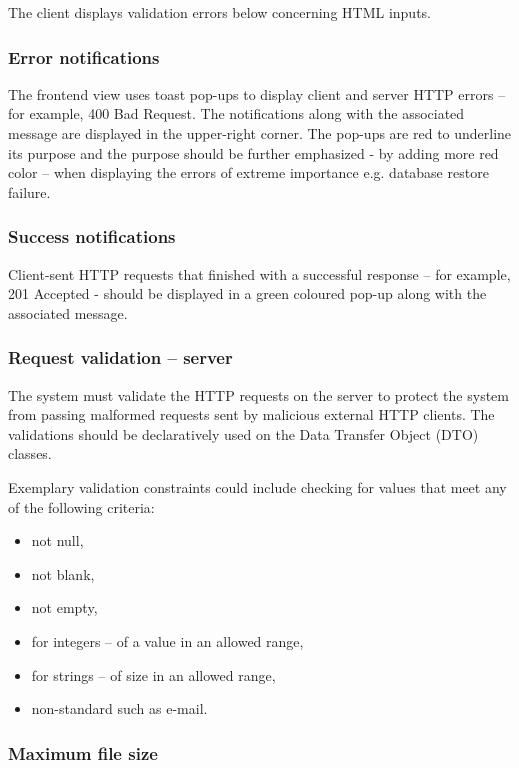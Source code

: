\documentclass[a4paper,twoside,12pt]{book}
\begin{document}
The client displays validation errors below concerning HTML inputs.

\subsubsection{Error notifications}

The frontend view uses toast pop-ups to display client and server HTTP errors \cite{bib:rfc7231} – for example, 400 Bad Request. The notifications along with the associated message are displayed in the upper-right corner. The pop-ups are red to underline its purpose and the purpose should be further emphasized - by adding more red color – when displaying the errors of extreme importance e.g. database restore failure.

\subsubsection{Success notifications}

Client-sent HTTP requests that finished with a successful response \cite{bib:rfc7231} – for example, 201 Accepted - should be displayed in a green coloured pop-up along with the associated message.

\subsubsection{Request validation – server}

The system must validate the HTTP requests on the server to protect the system from passing malformed requests sent by malicious external HTTP clients. The validations should be declaratively used on the Data Transfer Object (DTO) classes. 

Exemplary validation constraints could include checking for values that meet any of the following criteria:
\begin{itemize}
\item not null,
\item not blank,
\item not empty,
\item for integers – of a value in an allowed range,
\item for strings – of size in an allowed range,
\item non-standard such as e-mail.
\end{itemize}

\subsubsection{Maximum file size}
\end{document}

